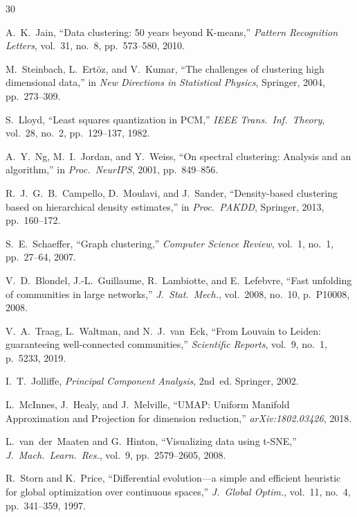 \documentclass[conference]{IEEEtran}
\begin{document}
\begin{thebibliography}{30}

A.~K.~Jain, ``Data clustering: 50 years beyond K-means,'' \emph{Pattern Recognition Letters}, vol.~31, no.~8, pp.~573--580, 2010.

M.~Steinbach, L.~Ert\"{o}z, and V.~Kumar, ``The challenges of clustering high dimensional data,'' in \emph{New Directions in Statistical Physics}, Springer, 2004, pp.~273--309.

S.~Lloyd, ``Least squares quantization in PCM,'' \emph{IEEE Trans.\ Inf.\ Theory}, vol.~28, no.~2, pp.~129--137, 1982.

A.~Y.~Ng, M.~I.~Jordan, and Y.~Weiss, ``On spectral clustering: Analysis and an algorithm,'' in \emph{Proc.\ NeurIPS}, 2001, pp.~849--856.

R.~J.~G.~B.~Campello, D.~Moulavi, and J.~Sander, ``Density-based clustering based on hierarchical density estimates,'' in \emph{Proc.\ PAKDD}, Springer, 2013, pp.~160--172.

S.~E.~Schaeffer, ``Graph clustering,'' \emph{Computer Science Review}, vol.~1, no.~1, pp.~27--64, 2007.

V.~D.~Blondel, J.-L.~Guillaume, R.~Lambiotte, and E.~Lefebvre, ``Fast unfolding of communities in large networks,'' \emph{J.\ Stat.\ Mech.}, vol.~2008, no.~10, p.~P10008, 2008.

V.~A.~Traag, L.~Waltman, and N.~J.~van~Eck, ``From Louvain to Leiden: guaranteeing well-connected communities,'' \emph{Scientific Reports}, vol.~9, no.~1, p.~5233, 2019.

I.~T.~Jolliffe, \emph{Principal Component Analysis}, 2nd~ed. Springer, 2002.

L.~McInnes, J.~Healy, and J.~Melville, ``UMAP: Uniform Manifold Approximation and Projection for dimension reduction,'' \emph{arXiv:1802.03426}, 2018.

L.~van~der~Maaten and G.~Hinton, ``Visualizing data using t-SNE,'' \emph{J.\ Mach.\ Learn.\ Res.}, vol.~9, pp.~2579--2605, 2008.

R.~Storn and K.~Price, ``Differential evolution---a simple and efficient heuristic for global optimization over continuous spaces,'' \emph{J.\ Global Optim.}, vol.~11, no.~4, pp.~341--359, 1997.


\end{thebibliography}
\end{document}
